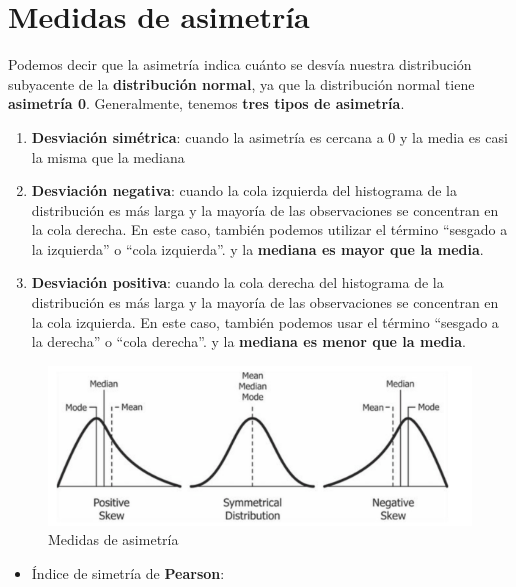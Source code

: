 \documentclass[
  11pt,
]{krantz}
\providecommand{\tightlist}{%
  \setlength{\itemsep}{0pt}\setlength{\parskip}{0pt}}
\theoremstyle{definition}
\theoremstyle{definition}
\theoremstyle{definition}
\theoremstyle{definition}
\theoremstyle{remark}
\begin{document}
\hypertarget{medidas-de-asimetruxeda}{%
\chapter{Medidas de asimetría}\label{medidas-de-asimetruxeda}}

Podemos decir que la asimetría indica cuánto se desvía nuestra distribución subyacente de la \textbf{distribución normal}, ya que la distribución normal tiene \textbf{asimetría 0}. Generalmente, tenemos \textbf{tres tipos de asimetría}.

\begin{enumerate}
\def\labelenumi{\arabic{enumi}.}
\item
  \textbf{Desviación simétrica}: cuando la asimetría es cercana a 0 y la media es casi la misma que la mediana
\item
  \textbf{Desviación negativa}: cuando la cola izquierda del histograma de la distribución es más larga y la mayoría de las observaciones se concentran en la cola derecha. En este caso, también podemos utilizar el término ``sesgado a la izquierda'' o ``cola izquierda''. y la \textbf{mediana es mayor que la media}.
\item
  \textbf{Desviación positiva}: cuando la cola derecha del histograma de la distribución es más larga y la mayoría de las observaciones se concentran en la cola izquierda. En este caso, también podemos usar el término ``sesgado a la derecha'' o ``cola derecha''. y la \textbf{mediana es menor que la media}.
\end{enumerate}

\begin{figure}
\centering
\includegraphics{simetria.png}
\caption{Medidas de asimetría}
\end{figure}

\begin{itemize}
\tightlist
\item
  Índice de simetría de \textbf{Pearson}:
\end{itemize}
\end{document}
